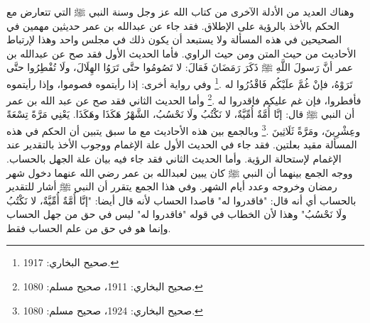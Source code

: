 وهناك العديد من الأدلة الآخرى من كتاب الله عز وجل وسنة النبي ﷺ التي تتعارض مع الحكم بالأخذ بالرؤية على الإطلاق. فقد جاء عن عبدالله بن عمر حديثين مهمين في الصحيحين في هذه المسألة ولا يستبعد أن يكون ذلك في مجلس واحد وهذا لإرتباط الأحاديث من حيث المتن ومن حيث الراوي. فأما الحديث الأول فقد صح عن عبدالله بن عمر أنَّ رَسولَ اللَّهِ ﷺ ذَكَرَ رَمَضَانَ فَقالَ: لا تَصُومُوا حتَّى تَرَوُا الهِلَالَ، ولَا تُفْطِرُوا حتَّى تَرَوْهُ، فإنْ غُمَّ علَيْكُم فَاقْدُرُوا له \href{https://shamela.ws/book/1284/1256#p6}{\faExternalLink} \cite{bukhari}.\footnote{صحيح البخاري: 1917.} وفي رواية أخرى: إذا رأيتموه فصوموا، وإذا رأيتموه فأفطروا، فإن غم عليكم فاقدروا له \href{https://shamela.ws/book/1284/1254#p1}{\faExternalLink} \cite{bukhari} \href{https://shamela.ws/book/1727/2430#p3}{\faExternalLink} \cite{muslim}.\footnote{صحيح البخاري: 1911، صحيح مسلم: 1080.} وأما الحديث الثاني فقد صح عن عبد الله بن عمر أن النبي ﷺ قال: إنَّا أُمَّةٌ أُمِّيَّةٌ، لا نَكْتُبُ ولَا نَحْسُبُ، الشَّهْرُ هَكَذَا وهَكَذَا. يَعْنِي مَرَّةً تِسْعَةً وعِشْرِينَ، ومَرَّةً ثَلَاثِينَ \href{https://shamela.ws/book/1284/1259#p3}{\faExternalLink} \cite{bukhari} \href{https://shamela.ws/book/1727/2443#p2}{\faExternalLink} \cite{muslim}.\footnote{صحيح البخاري: 1924، صحيح مسلم: 1080.} وبالجمع بين هذه الأحاديث مع ما سبق يتبين أن الحكم في هذه المسألة مقيد بعلتين.  فقد جاء في الحديث الأول علة الإغمام ووجوب الأخذ بالتقدير عند الإغمام لإستحالة الرؤية. وأما الحديث الثاني فقد جاء فيه بيان علة الجهل بالحساب. ووجه الجمع بينهما أن النبي ﷺ كان يبين لعبدالله بن عمر رضي الله عنهما دخول شهر رمضان وخروجه وعدد أيام الشهر. وفي هذا الجمع يتقرر أن النبي ﷺ أشار للتقدير بالحساب أي أنه قال: "فاقدروا له" قاصدا الحساب لأنه قال أيضا: "إنَّا أُمَّةٌ أُمِّيَّةٌ، لا نَكْتُبُ ولَا نَحْسُبُ" وهذا لأن الخطاب في قوله "فاقدروا له" ليس في حق من جهل الحساب وإنما هو في حق من علم الحساب فقط.

